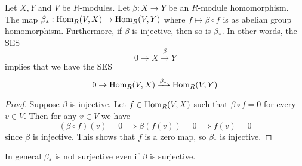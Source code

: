\begin{pro} \label{pro: inj implies inj}
    Let $X, Y$ and $V$ be $R$-modules. Let $\beta:X\to Y$ be an $R$-module homomorphism. The map $\beta_*: \operatorname{Hom}_R(V,X)\to \operatorname{Hom}_R(V,Y)$ where $f\mapsto \beta\circ f$ is as abelian group homomorphism. Furthermore, if $\beta$ is injective, then so is $\beta_*$. In other words, the SES
    \[0\to X \xrightarrow{\beta} Y\]
    implies that we have the SES
    \[0 \to \operatorname{Hom}_R(V,X)\xrightarrow{\beta_*} \operatorname{Hom}_R(V,Y)\]
\end{pro}

\begin{proof}
    Suppose $\beta$ is injective. Let $f\in \operatorname{Hom}_R(V,X)$ such that $\beta\circ f = 0$ for every $v\in V$. Then for any $v\in V$ we have
    \[(\beta\circ f)(v)=0 \implies \beta(f(v)) = 0 \implies f(v)=0\]
    since $\beta$ is injective. This shows that $f$ is a zero map, so $\beta_*$ is injective.
\end{proof}
\begin{re}
    In general $\beta_*$ is not surjective even if $\beta$ is surjective.
\end{re}

\medskip

